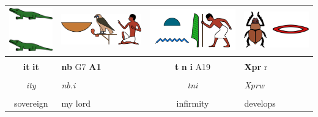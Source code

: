 \begin{center}
\begin{tabularx}{\linewidth}{cYcY}
	\includegraphics[scale=0.5]{word-images/1-2-1-ity} &
	\includegraphics[scale=0.5]{word-images/1-2-2-nbi} &
	\includegraphics[scale=0.5]{word-images/1-2-3-tni} &
	\includegraphics[scale=0.5]{word-images/1-2-4-xprw} \\
	\hline \\ 
	\textbf{it} \textbf{it} &
	\textbf{nb} G7 \textbf{A1} &
	\textbf{t} \textbf{n} \textbf{i} A19 &
	\textbf{Xpr} r \\
	\hline \\
	\textit{ity} & \textit{nb.i} & \textit{tni} & \textit{Xprw} \\  
	\hline \\
	sovereign & my lord & infirmity & develops
\end{tabularx}

\vspace{7.5mm}


\end{center}
